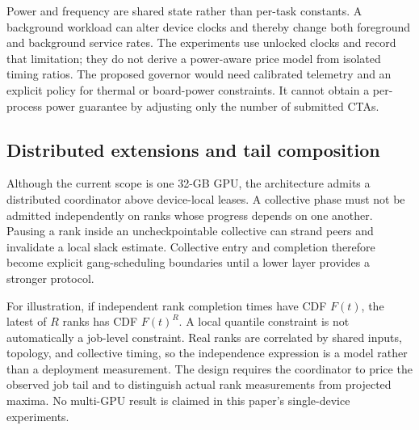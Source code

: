 Power and frequency are shared state rather than per-task constants. A
background workload can alter device clocks and thereby change both
foreground and background service rates. The experiments use unlocked
clocks and record that limitation; they do not derive a power-aware price
model from isolated timing ratios. The proposed governor would need
calibrated telemetry and an explicit policy for thermal or board-power
constraints. It cannot obtain a per-process power guarantee by adjusting
only the number of submitted CTAs.

\subsection{Distributed extensions and tail composition}
Although the current scope is one 32-GB GPU, the architecture admits a
distributed coordinator above device-local leases. A collective phase must
not be admitted independently on ranks whose progress depends on one another.
Pausing a rank inside an uncheckpointable collective can strand peers and
invalidate a local slack estimate. Collective entry and completion therefore
become explicit gang-scheduling boundaries until a lower layer provides a
stronger protocol.

For illustration, if independent rank completion times have CDF $F(t)$,
the latest of $R$ ranks has CDF $F(t)^R$. A local quantile constraint is not
automatically a job-level constraint. Real ranks are correlated by shared
inputs, topology, and collective timing, so the independence expression is
a model rather than a deployment measurement. The design requires the
coordinator to price the observed job tail and to distinguish actual rank
measurements from projected maxima. No multi-GPU result is claimed in this
paper's single-device experiments.

